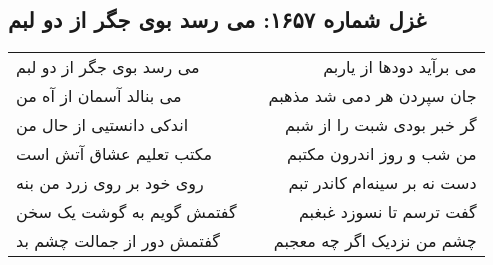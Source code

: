 \begin{center}
\section*{غزل شماره ۱۶۵۷: می رسد بوی جگر از دو لبم}
\label{sec:1657}
\begin{longtable}{l p{0.5cm} r}
می رسد بوی جگر از دو لبم
&&
می برآید دودها از یاربم
\\
می بنالد آسمان از آه من
&&
جان سپردن هر دمی شد مذهبم
\\
اندکی دانستیی از حال من
&&
گر خبر بودی شبت را از شبم
\\
مکتب تعلیم عشاق آتش است
&&
من شب و روز اندرون مکتبم
\\
روی خود بر روی زرد من بنه
&&
دست نه بر سینه‌ام کاندر تبم
\\
گفتمش گویم به گوشت یک سخن
&&
گفت ترسم تا نسوزد غبغبم
\\
گفتمش دور از جمالت چشم بد
&&
چشم من نزدیک اگر چه معجبم
\\
\end{longtable}
\end{center}
